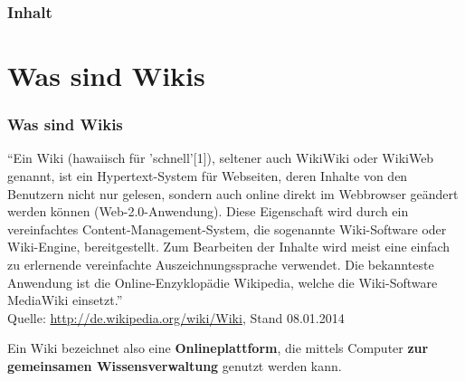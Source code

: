 \documentclass[handout]{beamer}   %
\begin{document}
\begin{frame}
  \frametitle{Inhalt}
  \tableofcontents
\end{frame}

\AtBeginSection{%
  \tableofcontents[currentsection]
}

\section{Was sind Wikis}

\begin{frame}
  \frametitle{Was sind Wikis}
  \begin{block}{}
    {\tiny \textquotedblleft Ein Wiki (hawaiisch für 'schnell'[1]), seltener auch WikiWiki
    oder WikiWeb genannt, ist ein Hypertext-System für Webseiten, deren
    Inhalte von den Benutzern nicht nur gelesen, sondern auch online direkt
    im Webbrowser geändert werden können (Web-2.0-Anwendung). Diese
    Eigenschaft wird durch ein vereinfachtes Content-Management-System, die
    sogenannte Wiki-Software oder Wiki-Engine, bereitgestellt. Zum
    Bearbeiten der Inhalte wird meist eine einfach zu erlernende
    vereinfachte Auszeichnungssprache verwendet. Die bekannteste Anwendung
    ist die Online-Enzyklopädie Wikipedia, welche die Wiki-Software
    MediaWiki einsetzt.\textquotedblright  \\ Quelle: \url{http://de.wikipedia.org/wiki/Wiki}, Stand 08.01.2014}
  \end{block}
  \begin{block}{}
    Ein Wiki bezeichnet also eine \textbf{Onlineplattform}, die mittels
    Computer \textbf{zur gemeinsamen Wissensverwaltung} genutzt werden
    kann.
  \end{block}
\end{frame}
\end{document}
